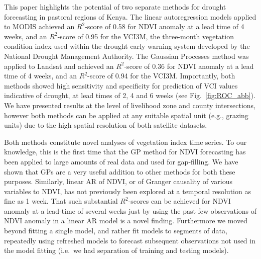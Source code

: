 \documentclass[review]{elsarticle}
\begin{document}
This paper highlights the potential of two separate methods for drought forecasting in pastoral regions of Kenya. The linear autoregression models applied to MODIS achieved an $R^2$-score of 0.58 for NDVI anomaly at a lead time of 4 weeks, and an $R^2$-score of 0.95 for the VCI3M, the three-month vegetation condition index used within the drought early warning system developed by the National Drought Management Authority. The Gaussian Processes method was applied to Landsat and achieved an $R^2$-score of 0.36 for NDVI anomaly at a lead time of 4 weeks, and an $R^2$-score of 0.94 for the VCI3M. Importantly, both methods showed high sensitivity and specificity for prediction of VCI values indicative of drought, at lead times of 2, 4 and 6 weeks (see Fig.~\ref{fig:ROC_abb}). We have presented results at the level of livelihood zone and county intersections, however both methods can be applied at any suitable spatial unit (e.g., grazing units) due to the high spatial resolution of both satellite datasets.


Both methods constitute novel analyses of vegetation index time series. To our knowledge, this is the first time that the GP method for NDVI forecasting has been applied to large amounts of real data and used for gap-filling. We have shown that GPs are a very useful addition to other methods for both these purposes. Similarly, linear AR of NDVI, or of Granger causality of various variables to NDVI, has not previously been explored at a temporal resolution as fine as 1 week. That such substantial $R^2$-scores can be achieved for NDVI anomaly at a lead-time of several weeks just by using the past few observations of NDVI anomaly in a linear AR model is a novel finding. Furthermore we moved beyond fitting a single model, and rather fit models to segments of data, repeatedly using refreshed models to forecast subsequent observations not used in the model fitting (i.e.~we had separation of training and testing models). 
\end{document}
